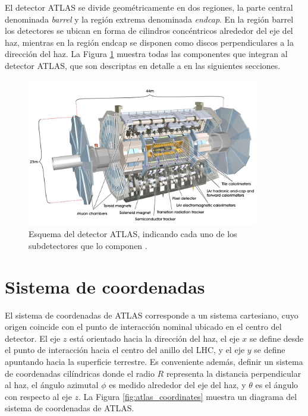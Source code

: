 El detector ATLAS se divide geométricamente en dos regiones, la parte central denominada \textit{barrel} y la región extrema denominada \textit{endcap}. En la región barrel los detectores se ubican en forma de cilindros concéntricos alrededor del eje del haz, mientras en la región endcap se disponen como discos perpendiculares a la dirección del haz. La Figura \ref{fig:atlas_1} muestra todas las componentes que integran al detector ATLAS, que son descriptas en detalle a en las siguientes secciones.

\begin{figure}
\centering
  \includegraphics[width=0.9\textwidth]{images/lhc/atlas_1.jpg}
  \caption{Esquema del detector ATLAS, indicando cada uno de los subdetectores que lo componen \cite{Pequenao:1095924}.}
  \label{fig:atlas_1}
\end{figure}

\section{Sistema de coordenadas}

El sistema de coordenadas de ATLAS corresponde a un sistema cartesiano, cuyo origen coincide con el punto de interacción nominal ubicado en el centro del detector. El eje $z$ está orientado hacia la dirección del haz, el eje $x$ se define desde el punto de interacción hacia el centro del anillo del LHC, y el eje $y$ se define apuntando hacia la superficie terrestre. Es conveniente además, definir un sistema de coordenadas cilíndricas donde el radio $R$ representa la distancia perpendicular al haz, el ángulo azimutal $\phi$ es medido alrededor del eje del haz, y $\theta$ es el ángulo con respecto al eje $z$. La Figura \ref{fig:atlas_coordinates} muestra un diagrama del sistema de coordenadas de ATLAS.

